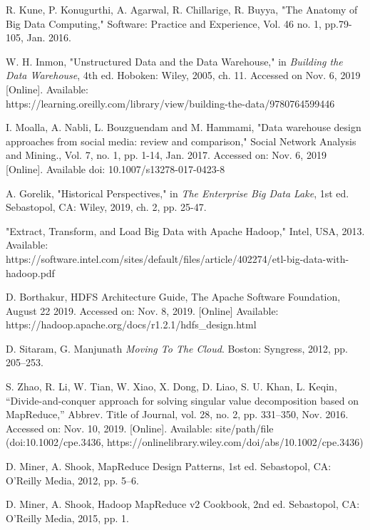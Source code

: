 \documentclass[journal]{IEEEtran}
\begin{document}
	\begin{thebibliography}{1}
		
		R. Kune, P. Konugurthi, A. Agarwal, R. Chillarige, R. Buyya,
		"The Anatomy of Big Data Computing," Software: Practice and Experience,
		Vol. 46 no. 1, pp.79-105, Jan. 2016. 
		
		W. H. Inmon, "Unstructured Data and the Data Warehouse," in 
		\emph{Building the Data Warehouse},
		4th ed. Hoboken: Wiley, 2005, ch. 11.
		Accessed on Nov. 6, 2019 [Online]. 
		Available: \\ https://learning.oreilly.com/library/view/building-the-data/9780764599446
		
		I. Moalla, A. Nabli, L. Bouzguendam and M. Hammami,
		"Data warehouse design approaches from social media: review and comparison,"
		Social Network Analysis and Mining., Vol. 7, no. 1, pp. 1-14, Jan. 2017.
		Accessed on: Nov. 6, 2019 [Online]. 
		Available doi: 10.1007/s13278-017-0423-8
		
		A. Gorelik, "Historical Perspectives," in 
		\emph{The Enterprise Big Data Lake},
		1st ed. Sebastopol, CA: Wiley, 2019, ch. 2, pp. 25-47.
		
		"Extract, Transform, and Load Big Data with Apache Hadoop," Intel, USA, 2013.
		Available:\\ https://software.intel.com/sites/default/files/article/402274/etl-big-data-with-hadoop.pdf
		
		D. Borthakur, HDFS Architecture Guide, The Apache Software Foundation,
		August 22 2019. Accessed on: Nov. 8, 2019. [Online] Available: \\
		https://hadoop.apache.org/docs/r1.2.1/hdfs\_design.html
		
		D. Sitaram, G. Manjunath \textit{Moving To The Cloud}. Boston: Syngress, 2012, pp. 205–253.
		
		S. Zhao, R. Li, W. Tian, W. Xiao, X. Dong, D. Liao, S. U. Khan, L. Keqin, “Divide-and-conquer approach for solving singular value decomposition based on MapReduce,” Abbrev. Title of Journal, vol. 28, no. 2, pp. 331–350, Nov. 2016. Accessed on: Nov. 10, 2019. [Online]. Available: site/path/file (doi:10.1002/cpe.3436, https://onlinelibrary.wiley.com/doi/abs/10.1002/cpe.3436)
		
	 	D. Miner, A. Shook, MapReduce Design Patterns, 1st ed. Sebastopol, CA: O'Reilly Media, 2012,
	 	pp. 5–6.
	 
	 	D. Miner, A. Shook, Hadoop MapReduce v2 Cookbook, 2nd ed. Sebastopol, CA: O'Reilly Media,
	 	2015, pp. 1.
		
	\end{thebibliography}
	
	
\end{document}
